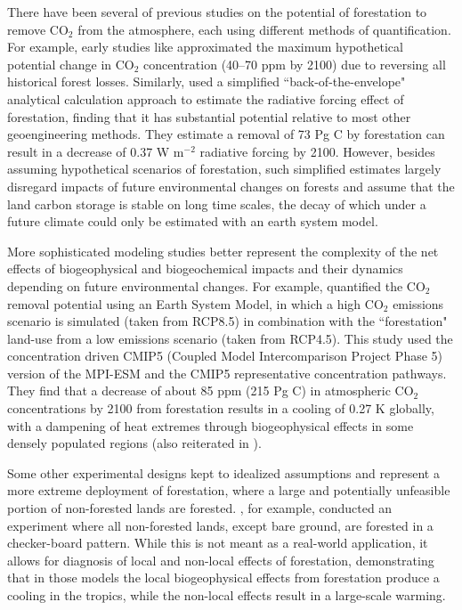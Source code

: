 \documentclass[draft]{agujournal2019}
\begin{document}
There have been several of previous studies on the potential of forestation to remove CO$_2$ from the atmosphere, each using different methods of quantification.
For example, early studies like  approximated the maximum hypothetical potential change in CO$_2$ concentration (40--70 ppm by 2100) due to reversing all historical forest losses. Similarly,  used a simplified ``back-of-the-envelope" analytical calculation approach to estimate the radiative forcing effect of forestation, finding that it has substantial potential relative to most other geoengineering methods.
They estimate a removal of 73 Pg C by forestation can result in a decrease of 0.37 W m$^{-2}$ radiative forcing by 2100.
However, besides assuming hypothetical scenarios of forestation, such simplified estimates largely disregard impacts of future environmental changes on forests and assume that the land carbon storage is stable on long time scales, the decay of which under a future climate could only be estimated with an earth system model.

More sophisticated modeling studies better represent the complexity of the net effects of biogeophysical and biogeochemical impacts and their dynamics depending on future environmental changes.
For example,  quantified the CO$_2$ removal potential using an Earth System Model, in which a high CO$_2$ emissions scenario is simulated (taken from RCP8.5) in combination with the ``forestation" land-use from a low emissions scenario (taken from RCP4.5).
This study used the concentration driven CMIP5 (Coupled Model Intercomparison Project Phase 5) version of the MPI-ESM and the CMIP5 representative concentration pathways.
They find that a decrease of about 85 ppm (215 Pg C) in atmospheric CO$_2$ concentrations by 2100 from forestation results in a cooling of 0.27 K globally, with a dampening of heat extremes through biogeophysical effects in some densely populated regions (also reiterated in ).

Some other experimental designs kept to idealized assumptions and represent a more extreme deployment of forestation, where a large and potentially unfeasible portion of non-forested lands are forested.
, for example, conducted an experiment where all non-forested lands, except bare ground, are forested in a checker-board pattern.
While this is not meant as a real-world application, it allows for diagnosis of local and non-local effects of forestation, demonstrating that in those models the local biogeophysical effects from forestation produce a cooling in the tropics, while the non-local effects result in a large-scale warming.
\end{document}
